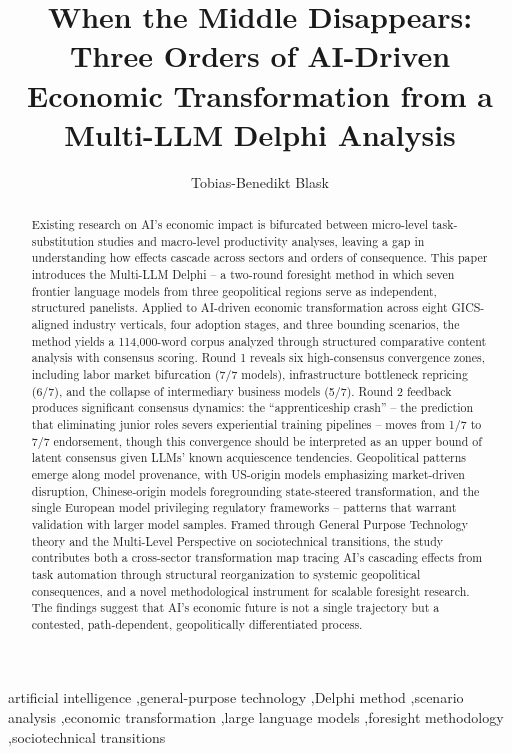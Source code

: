 \documentclass[preprint,review,12pt]{elsarticle}
\begin{document}
\begin{frontmatter}

\title{When the Middle Disappears: Three Orders of AI-Driven Economic Transformation from a Multi-LLM Delphi Analysis}

\author[hsharz]{Tobias-Benedikt Blask}

\address[hsharz]{Harz University of Applied Sciences, Wernigerode, Germany}

\begin{abstract}
Existing research on AI's economic impact is bifurcated between micro-level task-substitution studies and macro-level productivity analyses, leaving a gap in understanding how effects cascade across sectors and orders of consequence. This paper introduces the Multi-LLM Delphi -- a two-round foresight method in which seven frontier language models from three geopolitical regions serve as independent, structured panelists. Applied to AI-driven economic transformation across eight GICS-aligned industry verticals, four adoption stages, and three bounding scenarios, the method yields a 114,000-word corpus analyzed through structured comparative content analysis with consensus scoring. Round 1 reveals six high-consensus convergence zones, including labor market bifurcation (7/7 models), infrastructure bottleneck repricing (6/7), and the collapse of intermediary business models (5/7). Round 2 feedback produces significant consensus dynamics: the ``apprenticeship crash'' -- the prediction that eliminating junior roles severs experiential training pipelines -- moves from 1/7 to 7/7 endorsement, though this convergence should be interpreted as an upper bound of latent consensus given LLMs' known acquiescence tendencies. Geopolitical patterns emerge along model provenance, with US-origin models emphasizing market-driven disruption, Chinese-origin models foregrounding state-steered transformation, and the single European model privileging regulatory frameworks -- patterns that warrant validation with larger model samples. Framed through General Purpose Technology theory and the Multi-Level Perspective on sociotechnical transitions, the study contributes both a cross-sector transformation map tracing AI's cascading effects from task automation through structural reorganization to systemic geopolitical consequences, and a novel methodological instrument for scalable foresight research. The findings suggest that AI's economic future is not a single trajectory but a contested, path-dependent, geopolitically differentiated process.
\end{abstract}

\begin{keyword}
artificial intelligence \sep general-purpose technology \sep Delphi method \sep scenario analysis \sep economic transformation \sep large language models \sep foresight methodology \sep sociotechnical transitions
\end{keyword}

\end{frontmatter}
\end{document}
